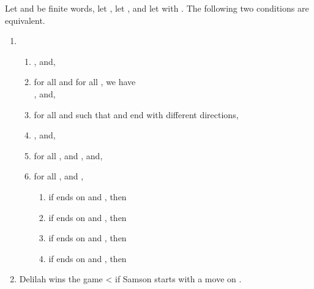 \documentclass{LMCS}
\begin{document}
\begin{thm}
  Let  and  be finite words, let , let , and let  with . The following two
  conditions are equivalent.

  \begin{enumerate}[\em(i)]
  \item
    \begin{enumerate}[\em(a)]
    \item , and,
    \item for all  and for all , we have\\
      , and,
    \item for all  and 
      such that  and  end with different directions,
      
    \item , and,
    \item for all ,  and , and,
    \item for all , and ,
      \begin{enumerate}[\em(f)]
      \item if  ends on  and , then 
      \item if  ends on  and , then 
      \item if  ends on  and , then 
      \item if  ends on  and , then 
      \end{enumerate}
    \end{enumerate}
  \item Delilah wins the game < if Samson starts with a move on .
  \end{enumerate}
\end{thm}
\end{document}
